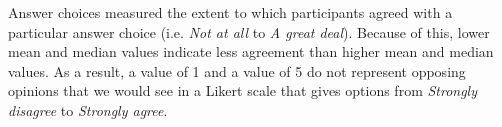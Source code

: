 Answer choices measured the extent to which participants agreed with a particular answer choice (i.e. \textit{Not at all} to \textit{A great deal}). Because of this, lower mean and median values indicate less agreement than higher mean and median values. As a result, a value of 1 and a value of 5 do not represent opposing opinions that we would see in a Likert scale that gives options from \textit{Strongly disagree} to \textit{Strongly agree}.